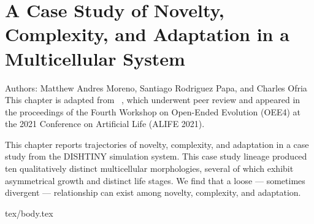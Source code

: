 \chapter{A Case Study of Novelty, Complexity, and Adaptation in a Multicellular System}
\label{ch:measuring-cna}

\noindent
Authors: Matthew Andres Moreno, Santiago Rodriguez Papa, and Charles Ofria \\
This chapter is adapted from ~\citep{moreno2021case}, which underwent peer review and appeared in the proceedings of the Fourth Workshop on Open-Ended Evolution (OEE4) at the 2021 Conference on Artificial Life (ALIFE 2021).

This chapter reports trajectories of novelty, complexity, and adaptation in a case study from the DISHTINY simulation system.
This case study lineage produced ten qualitatively distinct multicellular morphologies, several of which exhibit asymmetrical growth and distinct life stages.
We find that a loose --- sometimes divergent --- relationship can exist among novelty, complexity, and adaptation.

{tex/body.tex}
